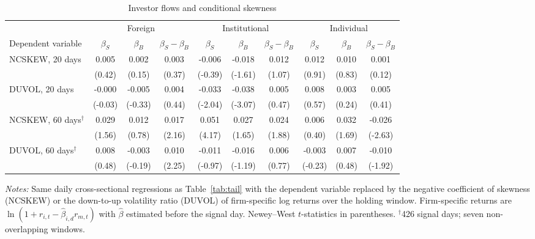 \begin{table}[htbp]\centering
\caption{Investor flows and conditional skewness}\label{tab:crash}
\scriptsize\setlength{\tabcolsep}{3pt}
\begin{tabular}{lccccccccc}\toprule
 & \multicolumn{3}{c}{Foreign} & \multicolumn{3}{c}{Institutional} & \multicolumn{3}{c}{Individual} \\
\cmidrule(lr){2-4}\cmidrule(lr){5-7}\cmidrule(lr){8-10}
Dependent variable & $\beta_S$ & $\beta_B$ & $\beta_S-\beta_B$ & $\beta_S$ & $\beta_B$ & $\beta_S-\beta_B$ & $\beta_S$ & $\beta_B$ & $\beta_S-\beta_B$ \\\midrule
NCSKEW, 20 days & 0.005 & 0.002 & 0.003 & -0.006 & -0.018 & 0.012 & 0.012 & 0.010 & 0.001 \\
 & (0.42) & (0.15) & (0.37) & (-0.39) & (-1.61) & (1.07) & (0.91) & (0.83) & (0.12) \\[2pt]
DUVOL, 20 days & -0.000 & -0.005 & 0.004 & -0.033 & -0.038 & 0.005 & 0.008 & 0.003 & 0.005 \\
 & (-0.03) & (-0.33) & (0.44) & (-2.04) & (-3.07) & (0.47) & (0.57) & (0.24) & (0.41) \\[2pt]
NCSKEW, 60 days$^\dagger$ & 0.029 & 0.012 & 0.017 & 0.051 & 0.027 & 0.024 & 0.006 & 0.032 & -0.026 \\
 & (1.56) & (0.78) & (2.16) & (4.17) & (1.65) & (1.88) & (0.40) & (1.69) & (-2.63) \\[2pt]
DUVOL, 60 days$^\dagger$ & 0.008 & -0.003 & 0.010 & -0.011 & -0.016 & 0.006 & -0.003 & 0.007 & -0.010 \\
 & (0.48) & (-0.19) & (2.25) & (-0.97) & (-1.19) & (0.77) & (-0.23) & (0.48) & (-1.92) \\[2pt]
\bottomrule\end{tabular}
\begin{minipage}{0.95\textwidth}\vspace{0.5em}\scriptsize
\textit{Notes:} Same daily cross-sectional regressions as Table~\ref{tab:tail} with the dependent variable replaced by the negative coefficient of skewness (NCSKEW) or the down-to-up volatility ratio (DUVOL) of firm-specific log returns over the holding window. Firm-specific returns are $\ln(1+r_{i,t}-\hat\beta_{i,d}r_{m,t})$ with $\hat\beta$ estimated before the signal day. Newey--West $t$-statistics in parentheses. $^\dagger$426 signal days; seven non-overlapping windows.
\end{minipage}\end{table}